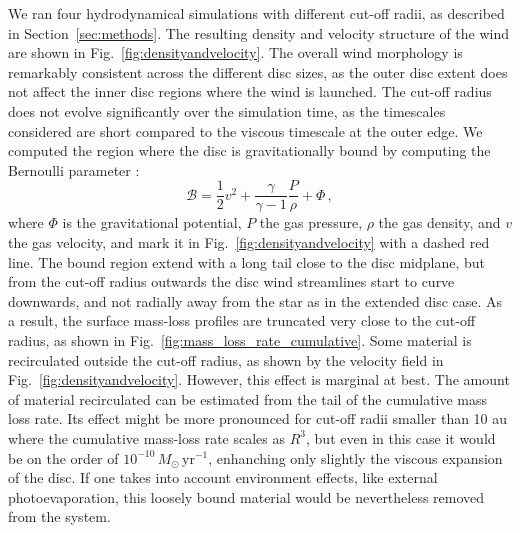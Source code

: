 \documentclass[fleqn,usenatbib]{mnras}
\begin{document}
We ran four hydrodynamical simulations with different cut-off radii, as described in Section~\ref{sec:methods}.
The resulting density and velocity structure of the wind are shown in Fig.~\ref{fig:densityandvelocity}.
The overall wind morphology is remarkably consistent across the different disc sizes, as the outer disc extent does not affect the inner disc regions where the wind is launched.
The cut-off radius does not evolve significantly over the simulation time, as the timescales considered are short compared to the viscous timescale at the outer edge.
We computed the region where the disc is gravitationally bound by computing the Bernoulli parameter \citep{2003PASA...20..337L}:
\begin{equation} \label{eq:Bernoulli}
    \mathcal{B} = \frac{1}{2} v^2 + \frac{\gamma}{\gamma - 1} \frac{P}{\rho} + \Phi\,,
\end{equation}
where $\Phi$ is the gravitational potential, $P$ the gas pressure, $\rho$ the gas density, and $v$ the gas velocity, and mark it in Fig.~\ref{fig:densityandvelocity} with a dashed red line.
The bound region extend with a long tail close to the disc midplane, but from the cut-off radius outwards the disc wind streamlines start to curve downwards, and not radially away from the star as in the extended disc case. As a result, the surface mass-loss profiles are truncated very close to the cut-off radius, as shown in Fig.~\ref{fig:mass_loss_rate_cumulative}.
Some material is recirculated outside the cut-off radius, as shown by the velocity field in Fig.~\ref{fig:densityandvelocity}. However, this effect is marginal at best. The amount of material recirculated can be estimated from the tail of the cumulative mass loss rate. Its effect might be more pronounced for cut-off radii smaller than 10 au where the cumulative mass-loss rate scales as $R^3$, but even in this case it would be on the order of $10^{-10}\, M_\odot\,\mathrm{yr}^{-1}$, enhanching only slightly the viscous expansion of the disc. If one takes into account environment effects, like external photoevaporation, this loosely bound material would be nevertheless removed from the system.
\end{document}

